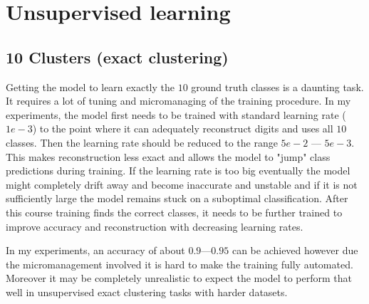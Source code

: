 \documentclass[11pt, a4paper]{report}
\theoremstyle{plain}
\theoremstyle{definition}
\theoremstyle{remark}
\begin{document}
\section{Unsupervised learning}
\subsection{10 Clusters (exact clustering)}
Getting the model to learn exactly the $10$ ground truth classes is a daunting
task. It requires a lot of tuning and micromanaging of the training procedure.
In my experiments, the model first needs to be trained with standard learning
rate ($1e-3$) to the point where it can adequately reconstruct digits and uses
all $10$ classes. Then the learning rate should be reduced to the range $5e-2$
--- $5e-3$. This makes reconstruction less exact and allows the model to "jump"
class predictions during training. If the learning rate is too big
eventually the model might completely drift away and become inaccurate and
unstable and if it is not sufficiently large the model remains stuck 
on a suboptimal classification. 
After this course training finds the correct classes, it needs to be further
trained to improve accuracy and reconstruction with decreasing learning rates.

In my experiments, an accuracy of about $0.9$---$0.95$ can be achieved
however due the micromanagement involved it is hard to make the training fully
automated. Moreover it may be completely unrealistic to expect the model
to perform that well in unsupervised exact clustering tasks with harder
datasets. 
\end{document}
